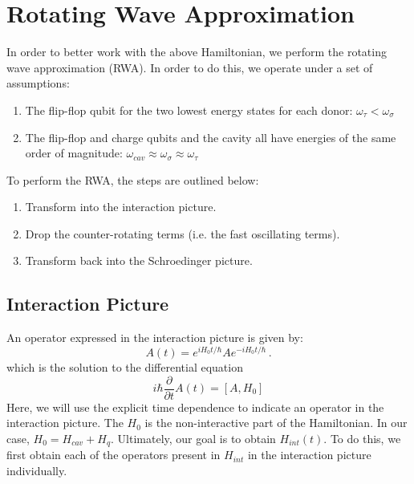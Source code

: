 \documentclass[
    preprint,
    amsmath,amssymb,
    aps,
    prb,
    floatfix,
]{revtex4-2}
\begin{document}
\section{Rotating Wave Approximation}
    In order to better work with the above Hamiltonian, we perform the rotating wave approximation (RWA). In order to do this, we operate under a set of assumptions:
    \begin{framed}
        \begin{enumerate}
            \item The flip-flop qubit for the two lowest energy states for each donor: $\omega_\tau < \omega_\sigma$
            \item The flip-flop and charge qubits and the cavity all have energies of the same order of magnitude: $\omega_{cav}\approx\omega_\sigma\approx\omega_\tau$
        \end{enumerate}
    \end{framed}

    To perform the RWA, the steps are outlined below:
    \begin{enumerate}
        \item Transform into the interaction picture.
        \item Drop the counter-rotating terms (i.e. the fast oscillating terms).
        \item Transform back into the Schroedinger picture.
    \end{enumerate}

    \subsection{Interaction Picture}
    An operator expressed in the interaction picture is given by:
    \begin{equation}
        A(t) = e^{iH_0t/\hbar}Ae^{-iH_0t/\hbar} \,.
    \end{equation}
    which is the solution to the differential equation
    \begin{equation}
        i\hbar\frac{\partial}{\partial t}A(t) = \left[A,H_0\right]
    \end{equation} 
    Here, we will use the explicit time dependence to indicate an operator in the interaction picture. The $H_0$ is the non-interactive part of the Hamiltonian. In our case, $H_0 = H_{cav} + H_q$. Ultimately, our goal is to obtain $H_{int}(t)$. To do this, we first obtain each of the operators present in $H_{int}$ in the interaction picture individually.
\end{document}
